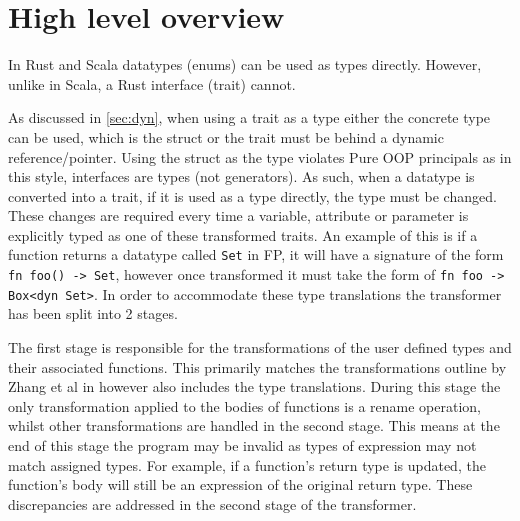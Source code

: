 \documentclass[ oneside,%
                    author={James Elgar},
                    degree={MEng},
                     title={Bidirectional transformer between functional and \\ object-oriented programming in Rust},
                  subtitle={}]{dissertation}
\newcommand{\weixin}{Zhang et al }
\newcommand{\rust}[1]{\texttt{#1}}
\begin{document}

\section{High level overview}
\label{sec:trans-overview}

In Rust and Scala datatypes (enums) can be used as types directly. However, unlike in Scala, a Rust interface (trait) cannot. 

As discussed in \autoref{sec:dyn}, when using a trait as a type either the concrete type can be used, which is the struct or the trait must be behind a dynamic reference/pointer. Using the struct as the type violates Pure OOP principals as in this style, interfaces are types (not generators). As such, when a datatype is converted into a trait, if it is used as a type directly, the type must be changed. These changes are required every time a variable, attribute or parameter is explicitly typed as one of these transformed traits. An example of this is if a function returns a datatype called \rust{Set} in FP, it will have a signature of the form \rust{fn foo() -> Set}, however once transformed it must take the form of \rust{fn foo -> Box<dyn Set>}. In order to accommodate these type translations the transformer has been split into 2 stages. 



The first stage is responsible for the transformations of the user defined types and their associated functions. This primarily matches the transformations outline by \weixin in \cite{food} however also includes the type translations. During this stage the only transformation applied to the bodies of functions is a rename operation, whilst other transformations are handled in the second stage. This means at the end of this stage the program may be invalid as types of expression may not match assigned types. For example, if a function's return type is updated, the function's body will still be an expression of the original return type. These discrepancies are addressed in the second stage of the transformer.
\end{document}
